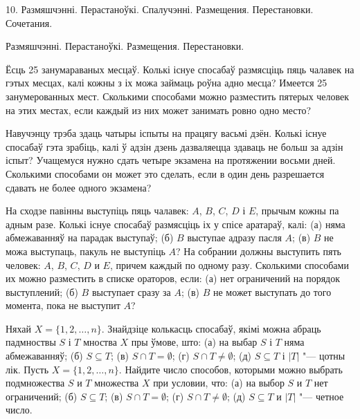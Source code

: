 \documentclass[12pt, a4paper]{article}
\begin{document}
\biLangHeader
{10. Размяшчэнні. Перастаноўкі. Спалучэнні.}
{Размещения. Перестановки. Сочетания.}

\biLangHeader
{Размяшчэнні. Перастаноўкі.}
{Размещения. Перестановки.}

\begin{problemList}

\problemItemSimple
{Ёсць 25 занумараваных месцаў. Колькі існуе спосабаў размясціць пяць чалавек на гэтых месцах,
калі кожны з іх можа займаць роўна адно месца?}
{Имеется 25 занумерованных мест. Сколькими способами можно разместить
пятерых человек на этих местах, если каждый из них может занимать
ровно одно место?}

\bigskip

\problemItemSimple
{Навучэнцу трэба здаць чатыры іспыты на працягу васьмі дзён. Колькі існуе спосабаў гэта зрабіць,
калі ў адзін дзень дазваляецца здаваць не больш за адзін іспыт?}
{Учащемуся нужно сдать четыре экзамена на протяжении восьми дней.
Сколькими способами он может это сделать, если в один день разрешается
сдавать не более одного экзамена?}

\bigskip

\problemItemSimple
{На сходзе павінны выступіць пяць чалавек: $A$, $B$, $C$, $D$ і $E$,
прычым кожны па адным разе. Колькі існуе спосабаў размясціць іх у спісе аратараў,
калі: (а) няма абмежаванняў на парадак выступаў; (б) $B$ выступае адразу пасля $A$;
(в) $B$ не можа выступаць, пакуль не выступіць $A$?}
{На собрании должны выступить пять человек: $A$, $B$, $C$, $D$ и $E$,
причем каждый по одному разу. Сколькими способами их можно разместить
в списке ораторов, если: (а) нет ограничений на порядок выступлений;
(б) $B$ выступает сразу за $A$; (в) $B$ не может выступать до того
момента, пока не выступит $A$?}

\bigskip

\problemItemSimple
{Няхай $X = \{1, 2, \ldots, n\}$. Знайдзіце колькасць спосабаў, якімі можна абраць
падмноствы $S$ і $T$ мноства $X$ пры ўмове, што:
(а) на выбар $S$ і $T$ няма абмежаванняў; (б) $S \subseteq T$; (в)
$S \cap T = \emptyset$; (г) $S \cap T \ne \emptyset$; (д)
$S \subseteq T$ і $|T|$ "--- цотны лік.}
{Пусть $X = \{1, 2, \ldots, n\}$. Найдите число способов, которыми
можно выбрать подмножества $S$ и $T$ множества $X$ при условии, что:
(а) на выбор $S$ и $T$ нет ограничений; (б) $S \subseteq T$; (в)
$S \cap T = \emptyset$; (г) $S \cap T \ne \emptyset$; (д)
$S \subseteq T$ и $|T|$ "--- четное число.}

\bigskip


\end{problemList}
\end{document}
